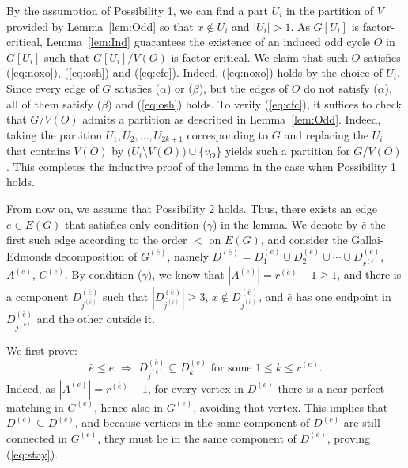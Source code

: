 \documentclass[10pt,a4paper]{amsart}
\begin{document}
By the assumption of Possibility 1, we can find a part $U_i$ in the partition of $V$ provided by Lemma~\ref{lem:Odd} so that $x \notin U_i$ and $|U_i| > 1$. As $G[U_i]$ is factor-critical, Lemma~\ref{lem:Ind} guarantees the existence of an induced odd cycle $O$ in $G[U_i]$ such that $G[U_i]/V(O)$ is factor-critical. We claim that such $O$ satisfies (\ref{eq:noxo}), (\ref{eq:osh}) and (\ref{eq:cfc}). Indeed, (\ref{eq:noxo}) holds by the choice of $U_i$. Since every edge of $G$ satisfies ($\alpha$) or ($\beta$), but the edges of $O$ do not satisfy ($\alpha$), all of them satisfy ($\beta$) and (\ref{eq:osh}) holds. To verify (\ref{eq:cfc}), it suffices to check that $G/V(O)$ admits a partition as described in Lemma~\ref{lem:Odd}. Indeed, taking the partition $U_1, U_2, \ldots , U_{2k+1}$ corresponding to $G$ and replacing the $U_i$ that contains $V(O)$ by $\bigl( U_i \setminus V(O) \bigr) \cup \{v_O\}$ yields such a partition for $G/V(O)$. This completes the inductive proof of the lemma in the case when Possibility 1 holds.

From now on, we assume that Possibility 2 holds. Thus, there exists an edge $e \in E(G)$ that satisfies only condition ($\gamma$) in the lemma. We denote by $\bar{e}$ the first such edge according to the order $<$ on $E(G)$, and consider the Gallai-Edmonds decomposition of $G^{(\bar{e})}$, namely $D^{(\bar{e})} = D_1^{(\bar{e})} \cup D_2^{(\bar{e})} \cup \cdots \cup D_{r^{(\bar{e})}}^{(\bar{e})}$, $A^{(\bar{e})}$, $C^{(\bar{e})}$. By condition ($\gamma$), we know that $|A^{(\bar{e})}| = r^{(\bar{e})} - 1 \ge 1$, and there is a component $D_{j^{(\bar{e})}}^{(\bar{e})}$ such that $|D_{j^{(\bar{e})}}^{(\bar{e})}| \ge 3$, $x \notin D_{j^{(\bar{e})}}^{(\bar{e})}$, and $\bar{e}$ has one endpoint in $D_{j^{(\bar{e})}}^{(\bar{e})}$ and the other outside it.

We first prove:
\begin{equation} \label{eq:stay}
\bar{e} \le e \,\,\Longrightarrow\,\, D_{j^{(\bar{e})}}^{(\bar{e})} \subseteq D_k^{(e)} \textrm{ for some } 1 \le k \le r^{(e)}.
\end{equation}
Indeed, as $|A^{(\bar{e})}| = r^{(\bar{e})} - 1$, for every vertex in $D^{(\bar{e})}$ there is a near-perfect matching in $G^{(\bar{e})}$, hence also in $G^{(e)}$, avoiding that vertex. This implies that $D^{(\bar{e})} \subseteq D^{(e)}$, and because vertices in the same component of $D^{(\bar{e})}$ are still connected in $G^{(e)}$, they must lie in the same component of $D^{(e)}$, proving (\ref{eq:stay}).
\end{document}
